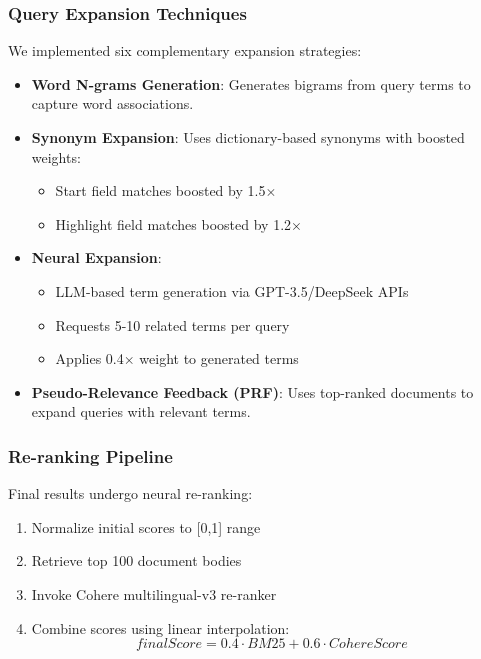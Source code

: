 \subsubsection{Query Expansion Techniques}
\label{subsubsec:Query Expansion Techniques}
We implemented six complementary expansion strategies:

\begin{itemize}
    \item \textbf{Word N-grams Generation}: Generates bigrams from query terms to capture word associations.
    \item \textbf{Synonym Expansion}: Uses dictionary-based synonyms with boosted weights:
    \begin{itemize}
        \item Start field matches boosted by 1.5$\times$
        \item Highlight field matches boosted by 1.2$\times$
    \end{itemize}
    \item \textbf{Neural Expansion}: 
    \begin{itemize}
    \item LLM-based term generation via GPT-3.5/DeepSeek APIs
    \item Requests 5-10 related terms per query
    \item Applies 0.4$\times$ weight to generated terms
    \end{itemize}
    \item \textbf{Pseudo-Relevance Feedback (PRF)}: Uses top-ranked documents to expand queries with relevant terms.
\end{itemize}

\subsubsection{Re-ranking Pipeline}
\label{subsubsec:Re-ranking Pipeline}
Final results undergo neural re-ranking:

\begin{enumerate}
    \item Normalize initial scores to [0,1] range
    \item Retrieve top 100 document bodies
    \item Invoke Cohere multilingual-v3 re-ranker
    \item Combine scores using linear interpolation:
    \[
    \mathit{finalScore} = 0.4 \cdot \mathit{BM25} + 0.6 \cdot \mathit{CohereScore}
    \]
\end{enumerate}





